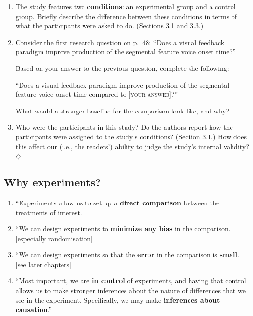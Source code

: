\documentclass[a4paper]{tufte-book}\usepackage[]{graphicx}\usepackage[]{xcolor}
\newcommand{\term}[1]{\textbf{#1}}
\newcommand*{\parend}[1][$\diamondsuit$]{%
  \unskip\nobreak\hspace{1em plus 1fill}$\diamondsuit$%
}
\begin{document}
  \begin{enumerate}
    \item The study features two \term{conditions}:
    an experimental group and a control group.
    Briefly describe the difference between these conditions in terms
    of what the participants were asked to do. (Sections 3.1 and 3.3.)
    
    \item Consider the first research question on p.~48:
    ``Does a visual feedback paradigm improve production of the segmental
    feature voice onset time?''
    
    Based on your answer to the previous question, complete the following:
    
    ``Does a visual feedback paradigm improve production of the segmental
    feature voice onset time compared to [\textsc{your answer}]?''
    
    What would a stronger baseline for the comparison look like, and why?
    
    \item Who were the participants in this study? 
    Do the authors report how the participants were assigned to the study's
    conditions? (Section 3.1.) 
    How does this affect our (i.e., the readers') ability to judge the study's
    internal validity? \parend
\end{enumerate}

\subsection{Why experiments?}
 \begin{enumerate}
  \item ``Experiments allow us to set up a \textbf{direct comparison} between the treatments of interest.
  \item ``We can design experiments to \textbf{minimize any bias} in the comparison. [especially randomisation]
  \item ``We can design experiments so that the \textbf{error} in the comparison is \textbf{small}. [see later chapters]
  \item ``Most important, we are \textbf{in control} of experiments, and having that control allows us to make stronger inferences about the nature of differences that we see in the experiment. Specifically, we may make \textbf{inferences about causation}.'' \citep[p.~2, my emphasis]{Oehlert2010}
 \end{enumerate}
\end{document}
